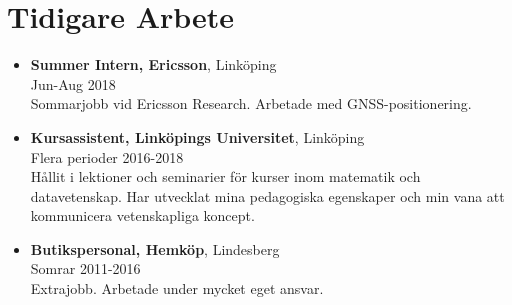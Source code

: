 \documentclass[12pt]{article}
\newcommand{\text}[2]{#2}
\newcommand{\text}[2]{#1}
\begin{document}
\section*{\text{Previous Work}{Tidigare Arbete}}
\begin{itemize}
    \item \textbf{Summer Intern, Ericsson}, Linköping\\
        Jun-Aug 2018\\
        \text{
            Summer internship at Ericsson Research. Worked with GNSS positioning.
        }{
            Sommarjobb vid Ericsson Research. Arbetade med GNSS-positionering.
        }

    \item \textbf{\text{Teaching Assistant, Linköping University}{Kursassistent, Linköpings Universitet}}, Linköping\\
        \text{Multiple periods}{Flera perioder} 2016-2018\\
        \text{
            In charge of lessons and seminars for courses in mathematics and computer science. Developed my teaching skills and my ability to communicate scientific concepts.
        }{
            Hållit i lektioner och seminarier för kurser inom matematik och datavetenskap. Har utvecklat mina pedagogiska egenskaper och min vana att kommunicera vetenskapliga koncept.
        }

    \item \textbf{\text{Store Clerk}{Butikspersonal}, Hemköp}, Lindesberg\\
        \text{Summers}{Somrar} 2011-2016\\
        \text{
            Extra job. Worked under a lot of individual responsibility.
        }{
            Extrajobb. Arbetade under mycket eget ansvar.
        }

\end{itemize}
\end{document}
